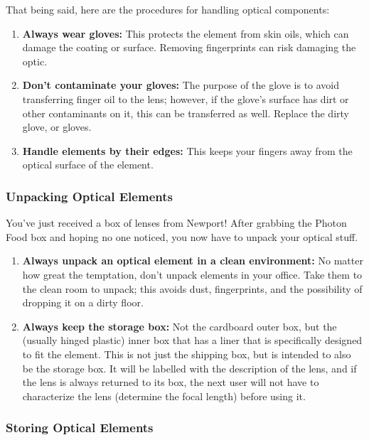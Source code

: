 \documentclass[11pt]{article}
\begin{document}
\hspace{-0.6cm}That being said, here are the procedures for handling optical components:

\begin{enumerate}[noitemsep]
   \item \textbf{Always wear gloves:} This protects the element from skin oils, which can damage the coating or surface. Removing fingerprints can risk damaging the optic.
   \item \textbf{Don't contaminate your gloves:} The purpose of the glove is to avoid transferring finger oil to the lens; however, if the glove's surface has dirt or other contaminants on it, this can be transferred as well. Replace the dirty glove, or gloves. 
   \item \textbf{Handle elements by their edges:} This keeps your fingers away from the optical surface of the element.
\end{enumerate}

\subsubsection{Unpacking Optical Elements}

You've just received a box of lenses from Newport! After grabbing the Photon Food box and hoping no one noticed, you now have to unpack your optical stuff.

\begin{enumerate}[noitemsep]
   \item \textbf{Always unpack an optical element in a clean environment:} No matter how great the temptation, don't unpack elements in your office. Take them to the clean room to unpack; this avoids dust, fingerprints, and the possibility of dropping it on a dirty floor.
   \item \textbf{Always keep the storage box:} Not the cardboard outer box, but the (usually hinged plastic) inner box that has a liner that is specifically designed to fit the element. This is not just the shipping box, but is intended to also be the storage box. It will be labelled with the description of the lens, and if the lens is always returned to its box, the next user will not have to characterize the lens (determine the focal length) before using it.
\end{enumerate}

\subsubsection{Storing Optical Elements}
\end{document}
